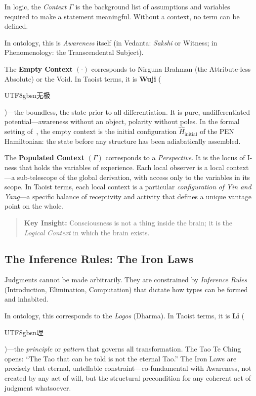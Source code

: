 \documentclass[12pt,a4paper]{article}
\begin{document}
In logic, the \emph{Context} $\Gamma$ is the background list of assumptions and variables required to make a statement meaningful. Without a context, no term can be defined.

In ontology, this is \emph{Awareness} itself (in Vedanta: \emph{Sakshi} or Witness; in Phenomenology: the Transcendental Subject).

The \textbf{Empty Context} $(\cdot)$ corresponds to Nirguna Brahman (the Attribute-less Absolute) or the Void. In Taoist terms, it is \textbf{Wuji} (\begin{CJK}{UTF8}{gbsn}无极\end{CJK})---the boundless, the state prior to all differentiation. It is pure, undifferentiated potential---awareness without an object, polarity without poles. In the formal setting of~\cite{pen2}, the empty context is the initial configuration $\hat{H}_{\mathrm{initial}}$ of the PEN Hamiltonian: the state before any structure has been adiabatically assembled.

The \textbf{Populated Context} $(\Gamma)$ corresponds to a \emph{Perspective}. It is the locus of I-ness that holds the variables of experience. Each local observer is a local context---a sub-telescope of the global derivation, with access only to the variables in its scope. In Taoist terms, each local context is a particular \emph{configuration of Yin and Yang}---a specific balance of receptivity and activity that defines a unique vantage point on the whole.

\begin{quote}
\textbf{Key Insight:} Consciousness is not a thing inside the brain; it is the \emph{Logical Context} in which the brain exists.
\end{quote}


\subsection{The Inference Rules: The Iron Laws}
\label{sec:inference}

Judgments cannot be made arbitrarily. They are constrained by \emph{Inference Rules} (Introduction, Elimination, Computation) that dictate how types can be formed and inhabited.

In ontology, this corresponds to the \emph{Logos} (Dharma). In Taoist terms, it is \textbf{Li} (\begin{CJK}{UTF8}{gbsn}理\end{CJK})---the \emph{principle} or \emph{pattern} that governs all transformation. The Tao Te Ching opens: ``The Tao that can be told is not the eternal Tao.'' The Iron Laws are precisely that eternal, untellable constraint---co-fundamental with Awareness, not created by any act of will, but the structural precondition for any coherent act of judgment whatsoever.
\end{document}
